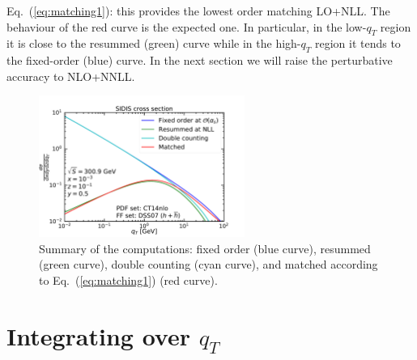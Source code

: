 \documentclass[10pt,a4paper]{article}
\begin{document}
Eq.~(\ref{eq:matching1}): this provides the lowest order matching
LO+NLL. The behaviour of the red curve is the expected one. In
particular, in the low-$q_T$ region it is close to the resummed
(green) curve while in the high-$q_T$ region it tends to the
fixed-order (blue) curve. In the next section we will raise the
perturbative accuracy to NLO+NNLL.
\begin{figure}[t]
  \begin{centering}
    \includegraphics[width=0.6\textwidth]{../plots/FONLL}
    \caption{Summary of the computations: fixed order (blue curve),
      resummed (green curve), double counting (cyan curve), and
      matched according to Eq.~(\ref{eq:matching1}) (red
      curve).\label{fig:FONLL}}
  \end{centering}
\end{figure}


\section{Integrating over $q_T$}
\end{document}
